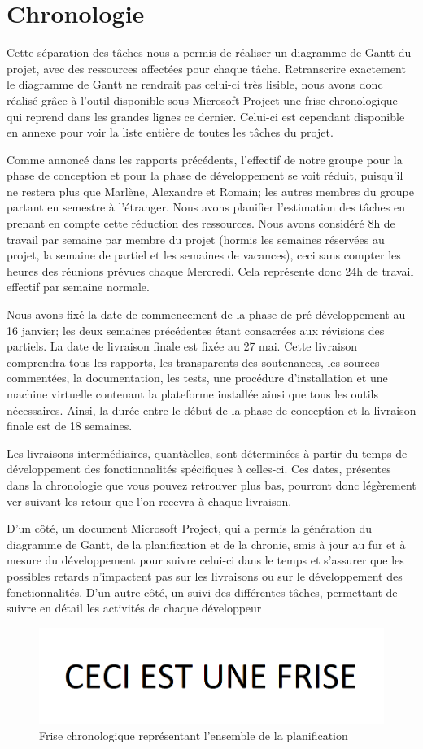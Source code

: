 \section{Chronologie}
\label{sec:chronologie}

	Cette séparation des tâches nous a permis de réaliser un diagramme de Gantt du projet, avec des ressources affectées pour chaque tâche. Retranscrire exactement le diagramme de Gantt ne rendrait pas celui-ci très lisible, nous avons donc réalisé grâce à l'outil disponible sous Microsoft Project une frise chronologique qui reprend dans les grandes lignes ce dernier. Celui-ci est cependant disponible en annexe pour voir la liste entière de toutes les tâches du projet.

	Comme annoncé dans les rapports précédents, l'effectif de notre groupe pour la phase de conception et pour la phase de développement se voit réduit, puisqu'il ne restera plus que Marlène, Alexandre et Romain; les autres membres du groupe partant en semestre à l'étranger. Nous avons planifier l'estimation des tâches en prenant en compte cette réduction des ressources. Nous avons considéré 8h de travail par semaine par membre du projet (hormis les semaines réservées au projet, la semaine de partiel et les semaines de vacances), ceci sans compter les heures des réunions prévues chaque Mercredi. Cela représente donc 24h de travail effectif par semaine normale.

	Nous avons fixé la date de commencement de la phase de pré-développement au 16 janvier; les deux semaines précédentes étant consacrées aux révisions des partiels. La date de livraison finale est fixée au 27 mai. Cette livraison comprendra tous les rapports, les transparents des soutenances, les sources commentées, la documentation, les tests, une procédure d'installation et une machine virtuelle contenant la plateforme installée ainsi que tous les outils nécessaires. Ainsi, la durée entre le début de la phase de conception et la livraison finale est de 18 semaines.

	Les livraisons intermédiaires, quantàelles, sont déterminées à partir du temps de développement des fonctionnalités spécifiques à celles-ci. Ces dates, présentes dans la chronologie que vous pouvez retrouver plus bas, pourront donc légèrement ver suivant les retour que l'on recevra à chaque livraison. 

	D'un côté, un document Microsoft Project, qui a permis la génération du diagramme de Gantt, de la planification et de la chronie, smis à jour au fur et à mesure du développement pour suivre celui-ci dans le temps et s'assurer que les possibles retards n'impactent pas sur les livraisons ou sur le développement des fonctionnalités. D'un autre côté, un suivi des différentes tâches, permettant de suivre en détail les activités de chaque développeur 



	\begin{figure}[H]
        \centering
        \includegraphics[width=1.3\textwidth, angle=90]{figure/frise.png}
            \caption{Frise chronologique représentant l'ensemble de la planification}
            \label{fig:frise}
    \end{figure}
